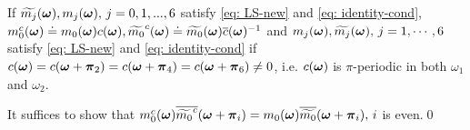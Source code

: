 \begin{comment}
Let $C_{\V{\omega}} = det(\M[-k_{\V{\omega}},:])$, then we have the following observation.
\begin{lemma}\label{lem: equal-det}
$C_{\V{\omega}} = C_{\V{\omega}+\V{\pi}_2} = C_{\V{\omega}+\V{\pi}_4} = C_{\V{\omega}+\V{\pi}_6}$
\end{lemma}
\noindent{\it Proof}
Because $\widetilde{M}(\V{\omega}+\V{\pi}_2) = P_{\V{\pi}_2}\M(\V{\omega})$ where $P_{\V{\pi}_2}$ is a row permutation matrix, it follows from the definition of $C_{\V{\omega}}$ that 
$C_{\V{\omega}} = det\big(\M[-k_{\V{\omega}},:](\V{\omega})\big) = det\big(\M[-k_{\V{\omega}+\V{\pi}_2},:](\V{\omega}+\V{\pi}_2) \big)= C_{\V{\omega}+\V{\pi}_2}$ where 
$\mathbf{1}_{k_{\V{\omega}+\V{\pi}_2}} = P_{\V{\pi}_2}\mathbf{1}_{k_{\V{\omega}}}$.
\qed\\[1em]
We assume that $m_0\in\mathbb{R}_{\geq 0}$ without phase. Let $m_0^C(\V{\omega}) = m_0(\V{\omega})|C_{\V{\omega}}|\in \mathbb{R}_{\geq 0}$ and $\mc{0} = \m{0}/|C_{\V{\omega}}|$, then Lemma \ref{lem: equal-det} implies the following.
\end{comment}


\begin{proposition}\label{prop: mc}
If $\widetilde{m_{j}}(\boldsymbol{\omega}), m_j(\boldsymbol{\omega}),\,  j = 0,1,...,6$ satisfy \eqref{eq: LS-new} and \eqref{eq: identity-cond}, 
$m_0^c(\boldsymbol{\omega})\doteq m_0(\boldsymbol{\omega})c(\boldsymbol{\omega}), \widetilde{m_0}^c(\boldsymbol{\omega})\doteq \widetilde{m_{0}}(\boldsymbol{\omega})\overline{c}(\boldsymbol{\omega})^{-1}$ and $m_j(\boldsymbol{\omega}),\widetilde{m_{j}}(\boldsymbol{\omega}), \, j = 1,\cdots,6$ 
satisfy \eqref{eq: LS-new} and \eqref{eq: identity-cond} if $ c(\boldsymbol{\omega}) = c(\boldsymbol{\omega}+\boldsymbol{\pi}_2)=c(\boldsymbol{\omega}+\boldsymbol{\pi}_4) = c(\boldsymbol{\omega}+\boldsymbol{\pi}_6) \neq 0$, i.e. $c(\boldsymbol{\omega})$ is $\pi$-periodic in both $\omega_1$ and $\omega_2$.
\end{proposition}
It suffices to show that $m_0^c(\boldsymbol{\omega})\overline{\widetilde{m_0}^c}(\boldsymbol{\omega} + \boldsymbol{\pi}_i) = m_0(\boldsymbol{\omega})\overline{\widetilde{m_{0}}}(\boldsymbol{\omega} + \boldsymbol{\pi}_{i}),\, i$ is even.\qed


